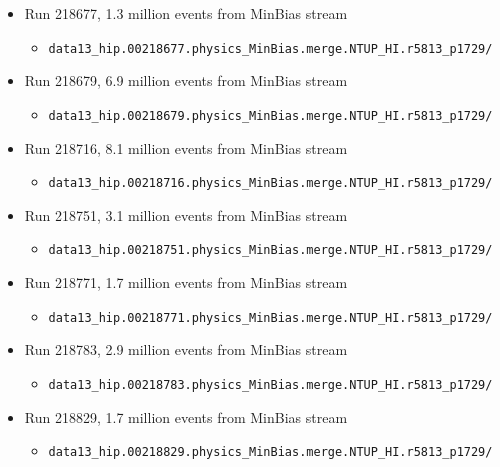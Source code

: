 \begin{itemize}
\item Run 218677, 1.3 million events from MinBias stream
\begin{itemize}[leftmargin=*]
\item[] \verb|data13_hip.00218677.physics_MinBias.merge.NTUP_HI.r5813_p1729/|
\end{itemize}

\item Run 218679, 6.9 million events from MinBias stream
\begin{itemize}[leftmargin=*]
\item[] \verb|data13_hip.00218679.physics_MinBias.merge.NTUP_HI.r5813_p1729/|
\end{itemize}

\item Run 218716, 8.1 million events from MinBias stream
\begin{itemize}[leftmargin=*]
\item[] \verb|data13_hip.00218716.physics_MinBias.merge.NTUP_HI.r5813_p1729/|
\end{itemize}

\item Run 218751, 3.1 million events from MinBias stream
\begin{itemize}[leftmargin=*]
\item[] \verb|data13_hip.00218751.physics_MinBias.merge.NTUP_HI.r5813_p1729/|
\end{itemize}

\item Run 218771, 1.7 million events from MinBias stream
\begin{itemize}[leftmargin=*]
\item[] \verb|data13_hip.00218771.physics_MinBias.merge.NTUP_HI.r5813_p1729/|
\end{itemize}

\item Run 218783, 2.9 million events from MinBias stream
\begin{itemize}[leftmargin=*]
\item[] \verb|data13_hip.00218783.physics_MinBias.merge.NTUP_HI.r5813_p1729/|
\end{itemize}

\item Run 218829, 1.7 million events from MinBias stream
\begin{itemize}[leftmargin=*]
\item[] \verb|data13_hip.00218829.physics_MinBias.merge.NTUP_HI.r5813_p1729/|
\end{itemize}


\end{itemize}
